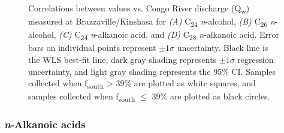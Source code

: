 \begin{figure}[p]
	\caption[Correlations between  and discharge]{Correlations between  values vs. Congo River discharge (Q\textsubscript{w}) measured at Brazzaville/Kinshasa for \textit{(A)} C\textsubscript{24} \textit{n}-alcohol, \textit{(B)} C\textsubscript{26} \textit{n}-alcohol, \textit{(C)} C\textsubscript{24} \textit{n}-alkanoic acid, and \textit{(D)} C\textsubscript{28} \textit{n}-alkanoic acid. Error bars on individual points represent $\pm 1 \sigma$ uncertainty. Black line is the WLS best-fit line, dark gray shading represents $\pm 1 \sigma$ regression uncertainty, and light gray shading represents the 95\% CI. Samples collected when f\textsubscript{south} > 39\% are plotted as white squares, and samples collected when f\textsubscript{south} $\leq$ 39\% are plotted as black circles.}
	\label{Ch4Fig:8} 
\end{figure}

\subsubsection{\textit{n}-Alkanoic acids}

